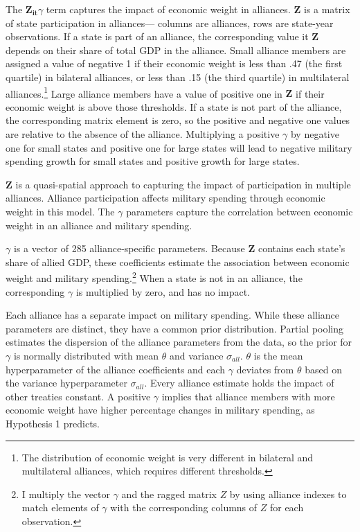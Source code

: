 \documentclass[12pt]{article}
\begin{document}
The $\mathbf{Z_{it}} \gamma$ term captures the impact of economic weight in alliances.  
$\textbf{Z}$ is a matrix of state participation in alliances--- columns are alliances, rows are state-year observations.  
If a state is part of an alliance, the corresponding value it $\textbf{Z}$ depends on their share of total GDP in the alliance. 
Small alliance members are assigned a value of negative 1 if their economic weight is less than .47 (the first quartile) in bilateral alliances, or less than .15 (the third quartile) in multilateral alliances.\footnote{The distribution of economic weight is very different in bilateral and multilateral alliances, which requires different thresholds.}
Large alliance members have a value of positive one in $\textbf{Z}$ if their economic weight is above those thresholds. 
If a state is not part of the alliance, the corresponding matrix element is zero, so the positive and negative one values are relative to the absence of the alliance. 
Multiplying a positive $\gamma$ by negative one for small states and positive one for large states will lead to negative military spending growth for small states and positive growth for large states. 


$\textbf{Z}$ is a quasi-spatial approach to capturing the impact of participation in multiple alliances.
Alliance participation affects military spending through economic weight in this model.  
The $\gamma$ parameters capture the correlation between economic weight in an alliance and military spending. 


$\gamma$ is a vector of 285 alliance-specific parameters.  
Because \textbf{Z} contains each state's share of allied GDP, these coefficients estimate the association between economic weight and military spending.\footnote{I multiply the vector $\gamma$ and the ragged matrix $Z$ by using alliance indexes to match elements of $\gamma$ with the corresponding columns of $Z$ for each observation.} 
When a state is not in an alliance, the corresponding $\gamma$ is multiplied by zero, and has no impact. 


Each alliance has a separate impact on military spending.
While these alliance parameters are distinct, they have a common prior distribution.
Partial pooling estimates the dispersion of the alliance parameters from the data, so the prior for $\gamma$ is normally distributed with mean $\theta$ and variance $\sigma_{all}$. 
$\theta$ is the mean hyperparameter of the alliance coefficients and each $\gamma$ deviates from $\theta$ based on the variance hyperparameter $\sigma_{all}$.
Every alliance estimate holds the impact of other treaties constant. 
A positive $\gamma$ implies that alliance members with more economic weight have higher percentage changes in military spending, as Hypothesis 1 predicts. 
    
\end{document}
